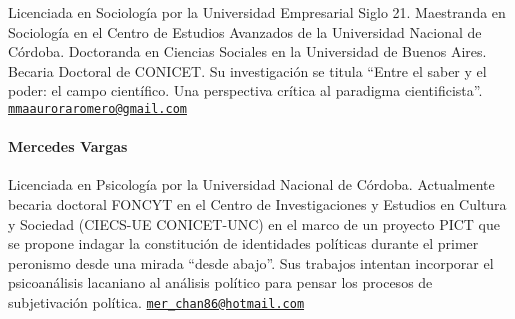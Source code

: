 Licenciada en Sociología por la Universidad Empresarial Siglo 21. Maestranda en Sociología en el Centro de Estudios Avanzados de la Universidad Nacional de Córdoba. Doctoranda en Ciencias Sociales en la Universidad de Buenos Aires. Becaria Doctoral de CONICET. Su investigación se titula \enquote{Entre el saber y el poder: el campo científico. Una perspectiva crítica al paradigma cientificista}. \href{mailto:maauroraromero@gmail.com}{\texttt{mmaauroraromero@gmail.com}}

\paragraph{Mercedes Vargas}


Licenciada en Psicología por la Universidad Nacional de Córdoba. Actualmente becaria doctoral FONCYT en el Centro de Investigaciones y Estudios en Cultura y Sociedad (CIECS-UE CONICET-UNC) en el marco de un proyecto PICT que se propone indagar la constitución de identidades políticas durante el primer peronismo desde una mirada \enquote{desde abajo}. Sus trabajos intentan incorporar el psicoanálisis lacaniano al análisis político para pensar los procesos de subjetivación política. \href{mailto:mer\_chan86@hotmail.com}{\texttt{mer\_chan86@hotmail.com}}

\ifPDF
{}
\fi
